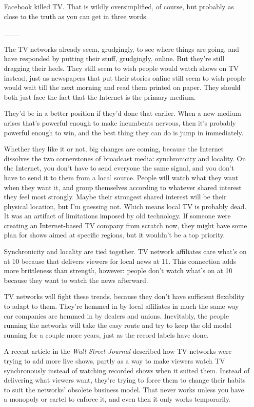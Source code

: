 Facebook killed TV. That is wildly oversimplified, of course, but
probably as close to the truth as you can get in three words.

\_\_\_

The TV networks already seem, grudgingly, to see where things are going,
and have responded by putting their stuff, grudgingly, online. But
they're still dragging their heels. They still seem to wish people would
watch shows on TV instead, just as newspapers that put their stories
online still seem to wish people would wait till the next morning and
read them printed on paper. They should both just face the fact that the
Internet is the primary medium.

They'd be in a better position if they'd done that earlier. When a new
medium arises that's powerful enough to make incumbents nervous, then
it's probably powerful enough to win, and the best thing they can do is
jump in immediately.

Whether they like it or not, big changes are coming, because the
Internet dissolves the two cornerstones of broadcast media:
synchronicity and locality. On the Internet, you don't have to send
everyone the same signal, and you don't have to send it to them from a
local source. People will watch what they want when they want it, and
group themselves according to whatever shared interest they feel most
strongly. Maybe their strongest shared interest will be their physical
location, but I'm guessing not. Which means local TV is probably dead.
It was an artifact of limitations imposed by old technology. If someone
were creating an Internet-based TV company from scratch now, they might
have some plan for shows aimed at specific regions, but it wouldn't be a
top priority.

Synchronicity and locality are tied together. TV network affiliates care
what's on at 10 because that delivers viewers for local news at 11. This
connection adds more brittleness than strength, however: people don't
watch what's on at 10 because they want to watch the news afterward.

TV networks will fight these trends, because they don't have sufficient
flexibility to adapt to them. They're hemmed in by local affiliates in
much the same way car companies are hemmed in by dealers and unions.
Inevitably, the people running the networks will take the easy route and
try to keep the old model running for a couple more years, just as the
record labels have done.

A recent article in the \emph{Wall Street Journal} described how TV
networks were trying to add more live shows, partly as a way to make
viewers watch TV synchronously instead of watching recorded shows when
it suited them. Instead of delivering what viewers want, they're trying
to force them to change their habits to suit the networks' obsolete
business model. That never works unless you have a monopoly or cartel to
enforce it, and even then it only works temporarily.

